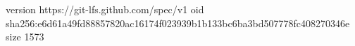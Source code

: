 version https://git-lfs.github.com/spec/v1
oid sha256:e6d61a49fd88857820ac16174f023939b1b133bc6ba3bd507778fc408270346e
size 1573
